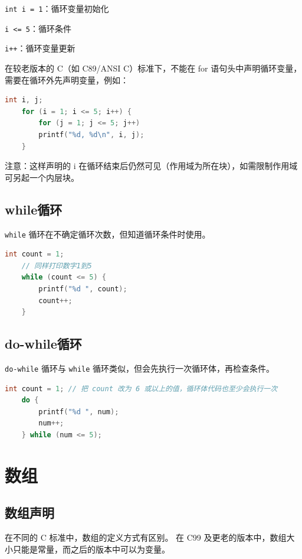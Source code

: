 \documentclass[lang=cn,newtx,10pt,scheme=chinese]{elegantbook}
\begin{document}
\lstinline{int i = 1}：循环变量初始化

\lstinline{i <= 5}：循环条件

\lstinline{i++}：循环变量更新

在较老版本的 C（如 C89/ANSI C）标准下，不能在 for 语句头中声明循环变量，需要在循环外先声明变量，例如：

\begin{lstlisting}[language=C]
    int i, j;
    for (i = 1; i <= 5; i++) {
        for (j = 1; j <= 5; j++)
        printf("%d, %d\n", i, j);
    }
\end{lstlisting}

注意：这样声明的 i 在循环结束后仍然可见（作用域为所在块），如需限制作用域可另起一个内层块。

\subsection{while循环}

\lstinline{while} 循环在不确定循环次数，但知道循环条件时使用。

\begin{lstlisting}[language=C]
    int count = 1;
    // 同样打印数字1到5
    while (count <= 5) {
        printf("%d ", count);
        count++;
    }
\end{lstlisting}


\subsection{do-while循环}

\lstinline{do-while} 循环与 \lstinline{while} 循环类似，但会先执行一次循环体，再检查条件。

\begin{lstlisting}[language=C]
    int count = 1; // 把 count 改为 6 或以上的值，循环体代码也至少会执行一次
    do {
        printf("%d ", num);
        num++;
    } while (num <= 5);
\end{lstlisting}

\section{数组}

\subsection{数组声明}

在不同的 C 标准中，数组的定义方式有区别。
在 C99 及更老的版本中，数组大小只能是常量，而之后的版本中可以为变量。
\end{document}
